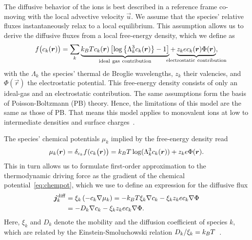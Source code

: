 The diffusive behavior of the ions is best described in a reference frame co-moving with the local advective velocity $\vec{u}$. We assume that the species' relative fluxes instantaneously relax to a local equilibrium. This assumption allows us to derive the diffusive fluxes from a local free-energy density, which we define as
%
\begin{equation}
\label{eq:model_free_energy}
f \big( c_{k}(\vec{r}) \big) = \sum_{k} \underbrace{\kT c_{k}(\vec{r}) \left[ \log \left\lbrace \Lambda_{k}^{3} c_{k}(\vec{r}) \right\rbrace - 1 \right] }_{\mathrm{ideal~gas~contribution}} + \underbrace{z_{k} e c_{k}(\vec{r}) \Phi(\vec{r})}_{\mathclap{\mathrm{electrostatic~contribution}}} ,
\end{equation}
%
with the $\Lambda_{k}$ the species' thermal de Broglie wavelengths, $z_{k}$ their valencies, and $\Phi(\vec{r})$ the electrostatic potential. This free-energy density consists of only an ideal-gas and an electrostatic contribution. The same assumptions form the basis of Poisson-Boltzmann (PB) theory. Hence, the limitations of this model are the same as those of PB. That means this model applies to monovalent ions at low to intermediate densities and surface charges~\cite{punkkinen08a,degraaf12a}.

The species' chemical potentials $\mu_{k}$ implied by the free-energy density read
%
\begin{equation}
\label{eq:chempot}
\mu_{k}(\bm{r}) = \delta_{c_k} f(c_{k}\big( \bm r ) \big) = k_{B}T \log(\Lambda_{k}^{3} c_{k}(\bm{r})) + z_{k} e \Phi(\bm{r}) .
\end{equation}
%
This in turn allows us to formulate first-order approximation to the thermodynamic driving force as the gradient of the chemical potential~\eqref{eq:chempot}, which we use to define an expression for the diffusive flux
%
\begin{equation}
\begin{aligned}
\label{eq:model_jdiff}
\bm{j}_{k}^{\mathrm{diff}} &= \xi_{k} \left( -c_{k} \nabla \mu_{k} \right) = -k_{B}T \xi_{k} \nabla c_{k} - \xi_{k} z_{k} e c_{k} \nabla\Phi \\
& = -D_{k} \nabla c_{k} - \xi_{k} z_{k} e c_{k} \nabla \Phi . 
\end{aligned}
\end{equation}
%
Here, $\xi_{k}$ and $D_{k}$ denote the mobility and the diffusion coefficient of species $k$, which are related by the Einstein-Smoluchowski relation $D_{k} / \xi_{k} = k_{B}T$~\cite{einstein1905a,smoluchowski1906a}.


